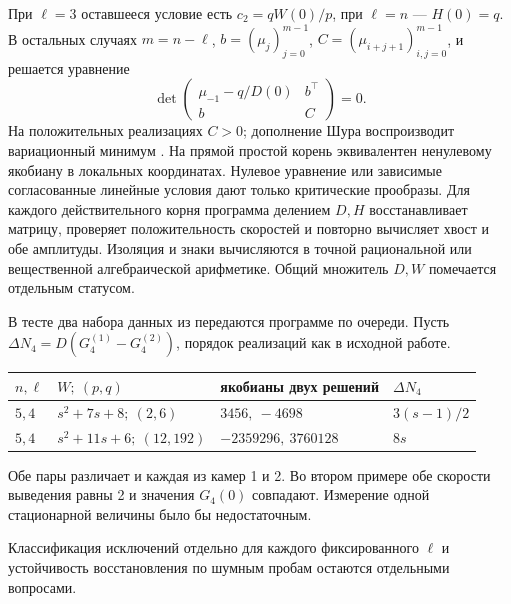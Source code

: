 \documentclass[11pt,a4paper]{article}
\begin{document}
При \(\ell=3\) оставшееся условие есть \(c_2=qW(0)/p\), при \(\ell=n\) --- \(H(0)=q\). В остальных случаях \(m=n-\ell\), \(b=(\mu_j)_{j=0}^{m-1}\), \(C=(\mu_{i+j+1})_{i,j=0}^{m-1}\), и решается уравнение
\[
 \det\begin{pmatrix}\mu_{-1}-q/D(0)&b^\top\\ b&C\end{pmatrix}=0 .
\]
На положительных реализациях \(C>0\); дополнение Шура воспроизводит вариационный минимум \cite[§4]{v2}. На прямой простой корень эквивалентен ненулевому якобиану в локальных координатах. Нулевое уравнение или зависимые согласованные линейные условия дают только критические прообразы. Для каждого действительного корня программа делением \(D,H\) восстанавливает матрицу, проверяет положительность скоростей и повторно вычисляет хвост и обе амплитуды. Изоляция и знаки вычисляются в точной рациональной или вещественной алгебраической арифметике. Общий множитель \(D,W\) помечается отдельным статусом.

В тесте два набора данных из \cite[§§6, 8]{v2} передаются программе по очереди. Пусть \(\Delta N_4=D(G_4^{(1)}-G_4^{(2)})\), порядок реализаций как в исходной работе.
\begin{center}\small
\begin{tabular}{llll}
\toprule
\(n,\ell\) & \(W;\ (p,q)\) & якобианы двух решений & \(\Delta N_4\)\\
\midrule
\(5,4\) & \(s^2+7s+8;\ (2,6)\) & \(3456,\ -4698\) & \(3(s-1)/2\)\\
\(5,4\) & \(s^2+11s+6;\ (12,192)\) & \(-2359296,\ 3760128\) & \(8s\)\\
\bottomrule
\end{tabular}
\end{center}
Обе пары различает и каждая из камер 1 и 2. Во втором примере обе скорости выведения равны 2 и значения \(G_4(0)\) совпадают. Измерение одной стационарной величины было бы недостаточным.

\smallskip
Классификация исключений отдельно для каждого фиксированного \(\ell\) и устойчивость восстановления по шумным пробам остаются отдельными вопросами.
\end{document}
